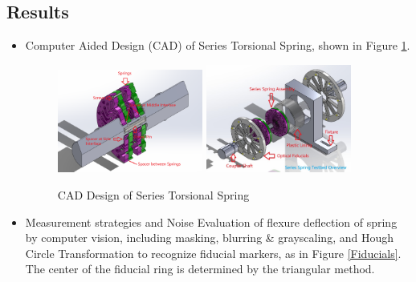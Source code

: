 \documentclass[12pt]{article}
\begin{document}
\subsection{Results}

\begin{itemize}
    \item {Computer Aided Design (CAD) of Series Torsional Spring, shown in Figure \ref*{Series Spring CAD}}. 
    
    \begin{figure}[H]

        \centering
        \includegraphics[width=0.45\textwidth]{portfolio/SeriesSpring_SectionView.png}
        \includegraphics[width=0.45\textwidth]{portfolio/SeriesASSEM_4in1.JPG}
        \caption{CAD Design of Series Torsional Spring}
        \label{Series Spring CAD}

    \end{figure}

    \item {Measurement strategies and Noise Evaluation of flexure deflection of spring by computer vision, including masking, blurring \& grayscaling, and Hough Circle Transformation to recognize fiducial markers, as in Figure \ref*{Fiducials}. The center of the fiducial ring is determined by the triangular method.}
    \begin{figure}[H]


\end{figure}
\end{itemize}
\end{document}
